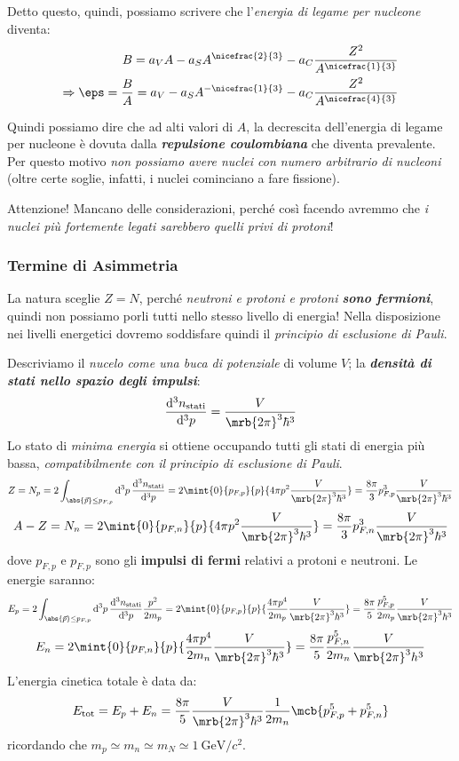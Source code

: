 Detto questo, quindi, possiamo scrivere che l'\textit{energia di legame per
nucleone} diventa:
\begin{align*}
  B = a_V A - a_S A ^{\nicefrac{2}{3}} - a_C \frac{Z^2}{A^{\nicefrac{1}{3}}}
  \\
  \Rightarrow \eps = \frac{B}{A} = a_V - a_S A^{-\nicefrac{1}{3}} - a_C
  \frac{Z^2}{A^{\nicefrac{4}{3}}}
\end{align*}

Quindi possiamo dire che ad alti valori di $A$, la decrescita dell'energia di
legame per nucleone è dovuta dalla \textit{\textbf{repulsione coulombiana}} che
diventa prevalente. Per questo motivo \textit{non possiamo avere nuclei con
numero arbitrario di nucleoni} (oltre certe soglie, infatti, i nuclei
cominciano a fare fissione).

\begin{note}[]
  Attenzione! Mancano delle considerazioni, perché così facendo avremmo che
  \textit{i nuclei più fortemente legati sarebbero quelli privi di protoni}!
\end{note}

\subsubsection{Termine di Asimmetria}
La natura sceglie $Z = N$, perché \textit{neutroni e protoni e protoni
\textbf{sono fermioni}}, quindi non possiamo porli tutti nello stesso livello
di energia! Nella disposizione nei livelli energetici dovremo soddisfare quindi
il \textit{principio di esclusione di Pauli}.

Descriviamo il \textit{nucelo come una buca di potenziale} di volume $V$; la
\textit{\textbf{densità di stati nello spazio degli impulsi}}:
\[
  \frac{\mathrm{d}^{3} n_\text{stati}}{\mathrm{d}^{3} p} = \frac{V}{\mrb{2
  \pi}^{3} \hbar^3}
\]
Lo stato di \textit{minima energia} si ottiene occupando tutti gli stati di
energia più bassa, \textit{compatibilmente con il principio di esclusione di
Pauli}.
\[
  Z = N_p = 2 \int_{\abs{\vec{p}}\leq p_{F,p}} \mathrm{d}^{3}
  p\,\frac{\mathrm{d}^{3} n_\text{stati}}{\mathrm{d}^{3} p}
  = 2 \mint{0}{p_{F,p}}{p}{4 \pi p^2 \frac{V}{\mrb{2 \pi}^{3} \hbar^3}}
  = \frac{8 \pi}{3} p _{F,p}^{3} \frac{V}{\mrb{2 \pi}^3 \hbar^3}
\]
\[
  A - Z = N_n = 2 \mint{0}{p _{F,n}}{p}{4 \pi p^2 \frac{V}{\mrb{2 \pi}^{3}
  \hbar^3}} = \frac{8 \pi}{3} p _{F,n}^{3} \frac{V}{\mrb{2 \pi}^{3} \hbar^3}
\]
dove $p_{F,p}$ e $p_{F,p}$ sono gli \textbf{impulsi di fermi} relativi
a protoni e neutroni.
Le energie saranno:
\[
  E_p = 2 \int_{\abs{\vec{p}}\leq p_{F,p}} \mathrm{d}^{3}
  p\,\frac{\mathrm{d}^{3} n_\text{stati}}{\mathrm{d}^{3} p} \frac{p^{2}}{2 m_p}
  = 2 \mint{0}{p_{F,p}}{p}{\frac{4 \pi p^4}{2 m_p} \frac{V}{\mrb{2 \pi}^{3}
  \hbar^3}}
  = \frac{8 \pi}{5} \frac{p _{F,p}^{5}}{2 m_p} \frac{V}{\mrb{2 \pi}^3 \hbar^3}
\]
\[
  E_n = 2 \mint{0}{p _{F,n}}{p}{\frac{4 \pi p^4}{2 m_n} \frac{V}{\mrb{2 \pi}^3
  \hbar^3}} = \frac{8 \pi}{5} \frac{p _{F,n}^{5}}{2 m_n} \frac{V}{\mrb{2
  \pi}^{3} h^3}
\]
L'energia cinetica totale è data da:
\[
  E _\text{tot} = E_p + E_n = \frac{8 \pi}{5} \frac{V}{\mrb{2 \pi}^{3} \hbar^3}
  \frac{1}{2 m_n} \mcb{p _{F,p}^{5} + p _{F, n}^{5}}
\]
ricordando che $m_p \simeq m_n \simeq m_N \simeq \SI{1}{\GeV \per c^2}$.
